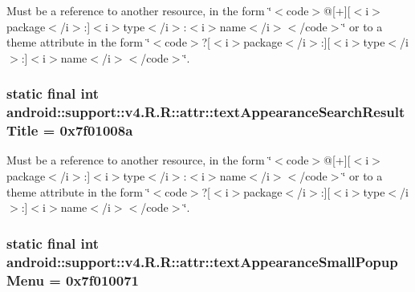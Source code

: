 Must be a reference to another resource, in the form \char`\"{}$<$code$>$@\mbox{[}+\mbox{]}\mbox{[}$<$i$>$package$<$/i$>$:\mbox{]}$<$i$>$type$<$/i$>$:$<$i$>$name$<$/i$>$$<$/code$>$\char`\"{} or to a theme attribute in the form \char`\"{}$<$code$>$?\mbox{[}$<$i$>$package$<$/i$>$:\mbox{]}\mbox{[}$<$i$>$type$<$/i$>$:\mbox{]}$<$i$>$name$<$/i$>$$<$/code$>$\char`\"{}. \hypertarget{classandroid_1_1support_1_1v4_1_1_r_1_1attr_bd7cb6e16abd4ec1ddf791592de0b8c6}{
\subsubsection[{textAppearanceSearchResultTitle}]{\setlength{\rightskip}{0pt plus 5cm}static final int android::support::v4.R.R::attr::textAppearanceSearchResultTitle = 0x7f01008a}}
\label{classandroid_1_1support_1_1v4_1_1_r_1_1attr_bd7cb6e16abd4ec1ddf791592de0b8c6}


Must be a reference to another resource, in the form \char`\"{}$<$code$>$@\mbox{[}+\mbox{]}\mbox{[}$<$i$>$package$<$/i$>$:\mbox{]}$<$i$>$type$<$/i$>$:$<$i$>$name$<$/i$>$$<$/code$>$\char`\"{} or to a theme attribute in the form \char`\"{}$<$code$>$?\mbox{[}$<$i$>$package$<$/i$>$:\mbox{]}\mbox{[}$<$i$>$type$<$/i$>$:\mbox{]}$<$i$>$name$<$/i$>$$<$/code$>$\char`\"{}. \hypertarget{classandroid_1_1support_1_1v4_1_1_r_1_1attr_400dab9e781d7947213c15adc6de09c6}{
\subsubsection[{textAppearanceSmallPopupMenu}]{\setlength{\rightskip}{0pt plus 5cm}static final int android::support::v4.R.R::attr::textAppearanceSmallPopupMenu = 0x7f010071}}
\label{classandroid_1_1support_1_1v4_1_1_r_1_1attr_400dab9e781d7947213c15adc6de09c6}



